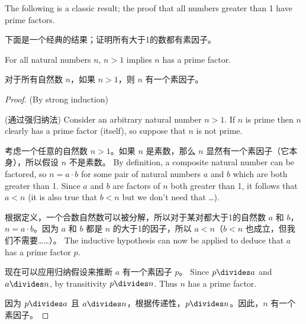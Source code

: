 The following is a classic result; the proof that all numbers
greater than 1 have prime factors.

下面是一个经典的结果；证明所有大于1的数都有素因子。
\begin{thm} For all natural numbers $n$, $n > 1$ implies $n$ has a prime 
factor.

对于所有自然数 $n$，如果 $n > 1$，则 $n$ 有一个素因子。
\end{thm}

\begin{proof} (By strong induction)

(通过强归纳法)
Consider an arbitrary natural number $n>1$.  If $n$ is prime then $n$ clearly
has a prime factor (itself), so suppose that $n$ is not prime.

考虑一个任意的自然数 $n>1$。如果 $n$ 是素数，那么 $n$ 显然有一个素因子（它本身），所以假设 $n$ 不是素数。
By 
definition, a composite
natural number can be factored, so $n=a \cdot b$ for some pair of natural
numbers $a$ and $b$ which are both greater than 1.  Since $a$ and $b$ are  
factors of $n$ both greater than 1, it follows that $a < n$ (it is also 
true that $b < n$ but we don't need that \ldots).

根据定义，一个合数自然数可以被分解，所以对于某对都大于1的自然数 $a$ 和 $b$，$n=a \cdot b$。因为 $a$ 和 $b$ 都是 $n$ 的大于1的因子，所以 $a < n$（$b < n$ 也成立，但我们不需要……）。
The inductive hypothesis
can now be applied to deduce that $a$ has a prime factor $p$.

现在可以应用归纳假设来推断 $a$ 有一个素因子 $p$。
Since
$p \divides a$ and $a \divides n$, by transitivity $p \divides n$.  Thus
$n$ has a prime factor.

因为 $p \divides a$ 且 $a \divides n$，根据传递性，$p \divides n$。因此，$n$ 有一个素因子。
\end{proof}
  

\newpage





